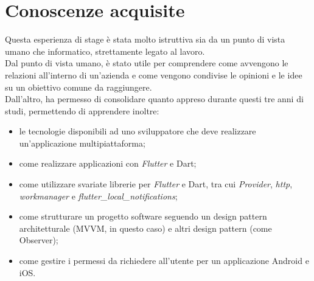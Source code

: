 \section{Conoscenze acquisite}
\label{sec:conoscenze-acquisite}

Questa esperienza di stage è stata molto istruttiva sia da un punto di vista umano che informatico, strettamente legato al lavoro.\\
Dal punto di vista umano, è stato utile per comprendere come avvengono le relazioni all'interno di un'azienda e come vengono condivise le opinioni e le idee su un obiettivo comune da raggiungere.\\
Dall'altro, ha permesso di consolidare quanto appreso durante questi tre anni di studi, permettendo di apprendere inoltre:
\begin{itemize}
    \item le tecnologie disponibili ad uno sviluppatore che deve realizzare un'applicazione multipiattaforma;
    \item come realizzare applicazioni con \emph{Flutter} e Dart;
    \item come utilizzare svariate librerie per \emph{Flutter} e Dart, tra cui \emph{Provider}, \emph{http}, \emph{workmanager} e \emph{flutter\_local\_notifications};
    \item come strutturare un progetto software seguendo un design pattern architetturale (MVVM, in questo caso) e altri design pattern (come Observer);
    \item come gestire i permessi da richiedere all'utente per un applicazione Android e iOS.
\end{itemize}